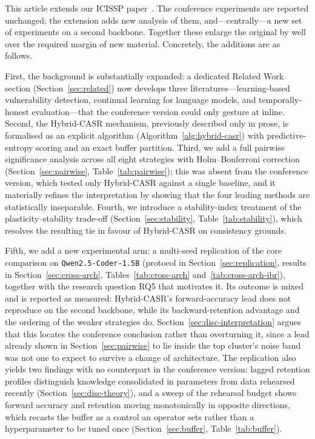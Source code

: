 \documentclass[a4paper,twoside]{article}
\begin{document}
\noindent
This article extends our ICISSP paper~\citep{Dou2026ICISSP}. The conference experiments are reported unchanged; the extension adds new analysis of them, and---centrally---a new set of experiments on a second backbone. Together these enlarge the original by well over the required margin of new material. Concretely, the additions are as follows.

First, the background is substantially expanded: a dedicated Related Work section (Section~\ref{sec:related}) now develops three literatures---learning-based vulnerability detection, continual learning for language models, and temporally-honest evaluation---that the conference version could only gesture at inline. Second, the Hybrid-CASR mechanism, previously described only in prose, is formalised as an explicit algorithm (Algorithm~\ref{alg:hybrid-casr}) with predictive-entropy scoring and an exact buffer partition. Third, we add a full pairwise significance analysis across all eight strategies with Holm--Bonferroni correction (Section~\ref{sec:pairwise}, Table~\ref{tab:pairwise}); this was absent from the conference version, which tested only Hybrid-CASR against a single baseline, and it materially refines the interpretation by showing that the four leading methods are statistically inseparable. Fourth, we introduce a stability-index treatment of the plasticity--stability trade-off (Section~\ref{sec:stability}, Table~\ref{tab:stability}), which resolves the resulting tie in favour of Hybrid-CASR on consistency grounds.

Fifth, we add a new experimental arm: a multi-seed replication of the core comparison on \texttt{Qwen2.5-Coder-1.5B} (protocol in Section~\ref{sec:replication}, results in Section~\ref{sec:cross-arch}, Tables~\ref{tab:cross-arch} and~\ref{tab:cross-arch-ibr}), together with the research question RQ5 that motivates it. Its outcome is mixed and is reported as measured: Hybrid-CASR's forward-accuracy lead does not reproduce on the second backbone, while its backward-retention advantage and the ordering of the weaker strategies do. Section~\ref{sec:disc-interpretation} argues that this locates the conference conclusion rather than overturning it, since a lead already shown in Section~\ref{sec:pairwise} to lie inside the top cluster's noise band was not one to expect to survive a change of architecture. The replication also yields two findings with no counterpart in the conference version: lagged retention profiles distinguish knowledge consolidated in parameters from data rehearsed recently (Section~\ref{sec:disc-theory}), and a sweep of the rehearsal budget shows forward accuracy and retention moving monotonically in opposite directions, which recasts the buffer as a control an operator sets rather than a hyperparameter to be tuned once (Section~\ref{sec:buffer}, Table~\ref{tab:buffer}).
\end{document}
